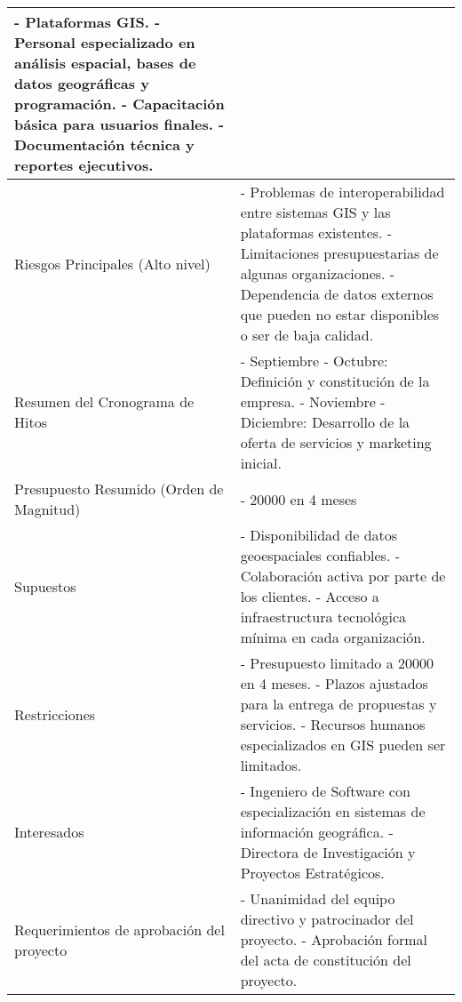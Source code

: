 \begin{tabular}{|>{\raggedright\arraybackslash}p{4cm}|>{\raggedright\arraybackslash}p{12.2cm}|}
- Plataformas GIS. \newline
- Personal especializado en análisis espacial, bases de datos geográficas y programación. \newline
- Capacitación básica para usuarios finales. \newline
- Documentación técnica y reportes ejecutivos. \\
\hline
Riesgos Principales (Alto nivel) & 
- Problemas de interoperabilidad entre sistemas GIS y las plataformas existentes. \newline
- Limitaciones presupuestarias de algunas organizaciones. \newline
- Dependencia de datos externos que pueden no estar disponibles o ser de baja calidad. \\
\hline
Resumen del Cronograma de Hitos & 
- Septiembre - Octubre: Definición y constitución de la empresa. \newline
- Noviembre - Diciembre: Desarrollo de la oferta de servicios y marketing inicial. \\
\hline
Presupuesto Resumido (Orden de Magnitud) & - 20000 en 4 meses \\
\hline
Supuestos & 
- Disponibilidad de datos geoespaciales confiables. \newline
- Colaboración activa por parte de los clientes. \newline
- Acceso a infraestructura tecnológica mínima en cada organización. \\
\hline
Restricciones & 
- Presupuesto limitado a 20000 en 4 meses. \newline
- Plazos ajustados para la entrega de propuestas y servicios. \newline
- Recursos humanos especializados en GIS pueden ser limitados. \\
\hline
Interesados & 
- Ingeniero de Software con especialización en sistemas de información geográfica.
\newline- Directora de Investigación y Proyectos Estratégicos. \\
\hline
Requerimientos de aprobación del proyecto & 
- Unanimidad del equipo directivo y patrocinador del proyecto. \newline
- Aprobación formal del acta de constitución del proyecto. \\
\hline
\end{tabular}
